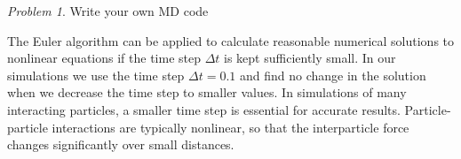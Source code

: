 \documentclass[preprint,showpacs,preprintnumbers,amsmath,amssymb,aps,prb]{revtex4-1}
\theoremstyle{remark}
\newtheorem{problem}{Problem}
\begin{document}
\begin{problem}{Write your own MD code}
\begin{enumerate}
  \end{enumerate}

  The Euler algorithm can be applied to
  calculate reasonable numerical solutions to 
  nonlinear
  equations if the time step $\Delta t$
  is kept sufficiently small.\cite{Newman}
  In our simulations we use the time step $\Delta t = 0.1$
  and find no change in the solution
  when we decrease the time step to smaller values.
  In simulations of
  many interacting particles,
  a smaller
  time step is essential for accurate results.
  Particle-particle interactions are typically nonlinear,
  so that the interparticle force changes significantly over small distances.
  
\end{problem}
\end{document}

